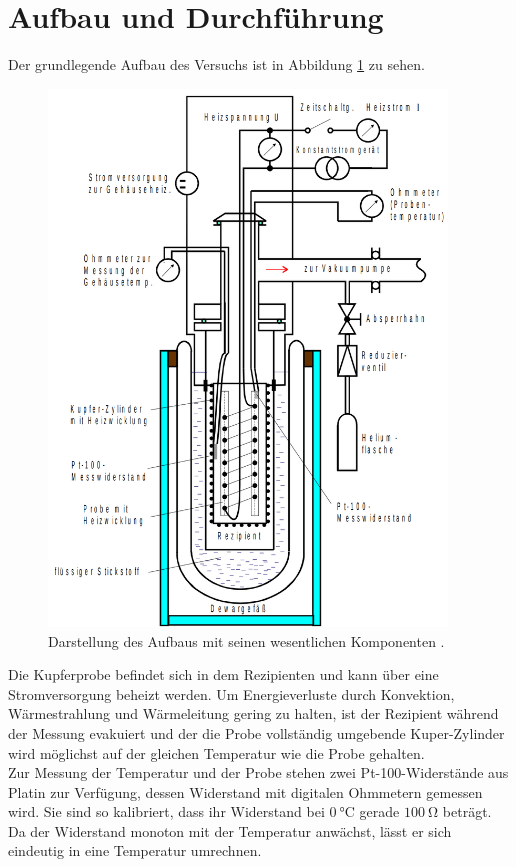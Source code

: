 \section{Aufbau und Durchführung}
\label{sec:aufbauUndDurchfuehrung}

Der grundlegende Aufbau des Versuchs ist in Abbildung \ref{fig:aufbau} zu sehen.

\begin{figure}
  \centering
  \includegraphics[width=300pt]{data/aufbau.png}
  \caption{Darstellung des Aufbaus mit seinen wesentlichen Komponenten \cite{versuchsanleitung}.}
  \label{fig:aufbau}
\end{figure}

Die Kupferprobe befindet sich in dem Rezipienten und kann über eine Stromversorgung beheizt werden. Um Energieverluste durch Konvektion, Wärmestrahlung und Wärmeleitung gering zu halten, ist der Rezipient während der Messung evakuiert und der die Probe vollständig umgebende Kuper-Zylinder wird möglichst auf der gleichen Temperatur wie die Probe gehalten.\\
Zur Messung der Temperatur und der Probe stehen zwei Pt-100-Widerstände aus Platin zur Verfügung, dessen Widerstand mit digitalen Ohmmetern gemessen wird. Sie sind so kalibriert, dass ihr Widerstand bei $\SI{0}{\celsius}$ gerade $\SI{100}{\ohm}$ beträgt. Da der Widerstand monoton mit der Temperatur anwächst, lässt er sich eindeutig in eine Temperatur umrechnen.

